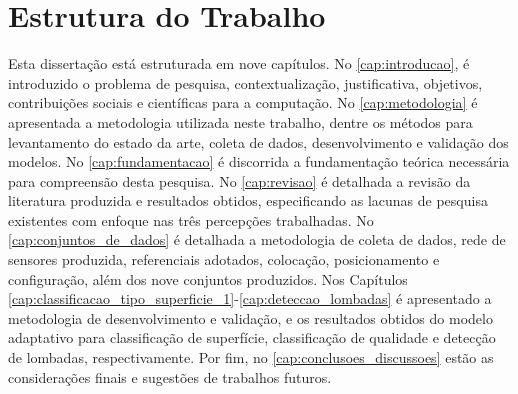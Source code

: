 \section{Estrutura do Trabalho}

Esta dissertação está estruturada em nove capítulos. No \autoref{cap:introducao}, é introduzido o problema de pesquisa, contextualização, justificativa, objetivos, contribuições sociais e científicas para a computação. No \autoref{cap:metodologia} é apresentada a metodologia utilizada neste trabalho, dentre os métodos para levantamento do estado da arte, coleta de dados, desenvolvimento e validação dos modelos. No \autoref{cap:fundamentacao} é discorrida a fundamentação teórica necessária para compreensão desta pesquisa. No \autoref{cap:revisao} é detalhada a revisão da literatura produzida e resultados obtidos, especificando as lacunas de pesquisa existentes com enfoque nas três percepções trabalhadas. No \autoref{cap:conjuntos_de_dados} é detalhada a metodologia de coleta de dados, rede de sensores produzida, referenciais adotados, colocação, posicionamento e configuração, além dos nove conjuntos produzidos. Nos Capítulos \ref{cap:classificacao_tipo_superficie_1}-\ref{cap:deteccao_lombadas} é apresentado a metodologia de desenvolvimento e validação, e os resultados obtidos do modelo adaptativo para classificação de superfície, classificação de qualidade e detecção de lombadas, respectivamente. Por fim, no \autoref{cap:conclusoes_discussoes} estão as considerações finais e sugestões de trabalhos futuros.
